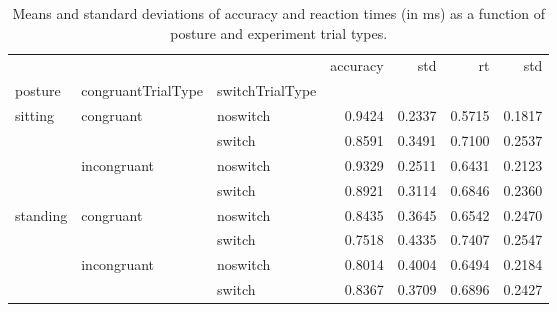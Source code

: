 \begin{table}
\centering
\caption{Means and standard deviations of accuracy and reaction times (in ms) as a function of posture and experiment trial types.}
\label{table-task-switching-replication-reaction-time}
\begin{tabular}{lllrrrr}
\toprule
         &             &        & accuracy &    std &     rt &    std \\
posture & congruantTrialType & switchTrialType &          &        &        &        \\
\midrule
sitting & congruant & noswitch &   0.9424 & 0.2337 & 0.5715 & 0.1817 \\
         &             & switch &   0.8591 & 0.3491 & 0.7100 & 0.2537 \\
         & incongruant & noswitch &   0.9329 & 0.2511 & 0.6431 & 0.2123 \\
         &             & switch &   0.8921 & 0.3114 & 0.6846 & 0.2360 \\
standing & congruant & noswitch &   0.8435 & 0.3645 & 0.6542 & 0.2470 \\
         &             & switch &   0.7518 & 0.4335 & 0.7407 & 0.2547 \\
         & incongruant & noswitch &   0.8014 & 0.4004 & 0.6494 & 0.2184 \\
         &             & switch &   0.8367 & 0.3709 & 0.6896 & 0.2427 \\
\bottomrule
\end{tabular}
\end{table}
